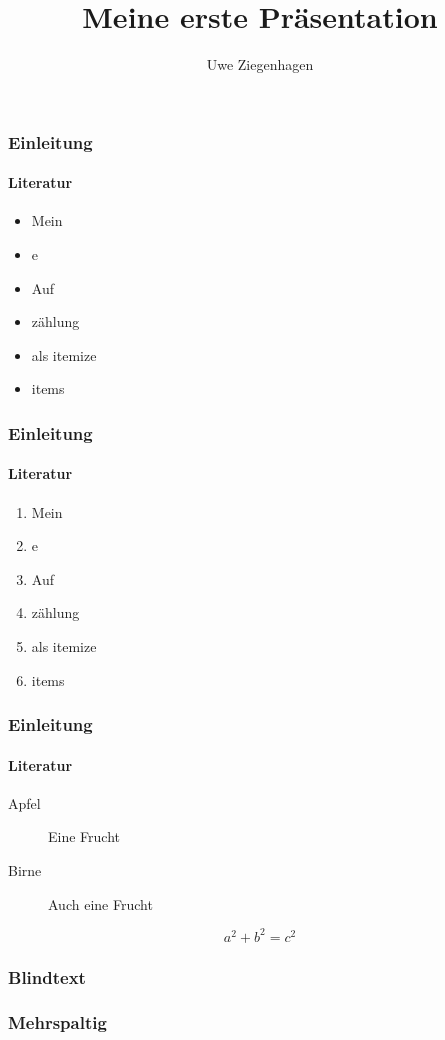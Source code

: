 \documentclass[12pt,ngerman]{beamer}
\author{Uwe Ziegenhagen}
\title{Meine erste Präsentation}
\institute{Dante e.V. Heidelberg}
\begin{document}
\begin{frame}

\maketitle

\end{frame}

\usebackgroundtemplate{}

\begin{frame}
\frametitle{Einleitung}
\framesubtitle{Literatur}

\begin{itemize}
	\item Mein
	\item e
	\item Auf
	\item zählung
	\item als itemize
	\item items
\end{itemize}

\end{frame}

\begin{frame}
\frametitle{Einleitung}
\framesubtitle{Literatur}

\begin{enumerate}
	\item<1-> Mein
	\item<2> e
	\item<1,3,4> Auf
	\item<-3> zählung
	\item als itemize
	\item items
\end{enumerate}

\end{frame}

\begin{frame}
\frametitle{Einleitung}
\framesubtitle{Literatur}

\begin{description}
	\item[Apfel] Eine \textcolor{fuh}{Frucht}
	\item[Birne] Auch eine \textcolor{FUH}{Frucht}
\end{description}

\[ a^2 + b^2 = c^2 \]

\end{frame}

\begin{frame}
\frametitle{Blindtext}

\blindtext

\end{frame}

\begin{frame}
\frametitle{Mehrspaltig}

\begin{columns}
\begin{column}{0.33\textwidth}
\tiny\blindtext
\end{column}
\begin{column}{0.33\textwidth}
\tiny\blindtext
\end{column}
\begin{column}{0.33\textwidth}
\tiny\blindtext
\end{column}
\end{columns}


\end{frame}
\end{document}
